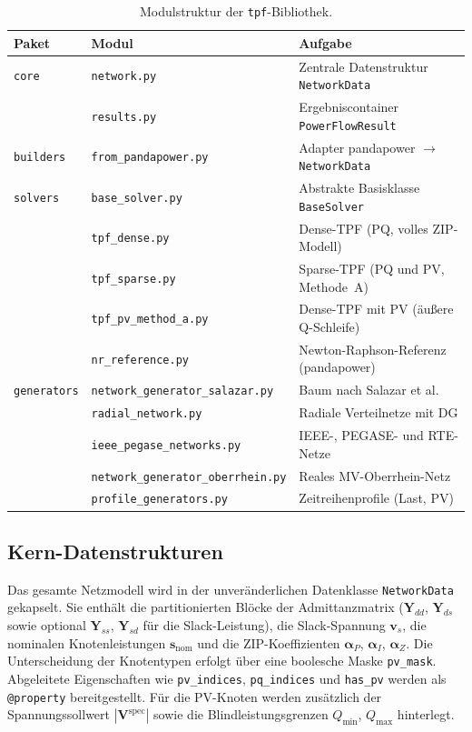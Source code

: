 \begin{table}[htbp]
	\centering
	\caption{Modulstruktur der \texttt{tpf}-Bibliothek.}
	\label{tab:module}
	\begin{tabular}{lll}
		\toprule
		\textbf{Paket} & \textbf{Modul} & \textbf{Aufgabe} \\
		\midrule
		\texttt{core}       & \texttt{network.py}    & Zentrale Datenstruktur \texttt{NetworkData} \\
		& \texttt{results.py}    & Ergebniscontainer \texttt{PowerFlowResult} \\
		\midrule
		\texttt{builders}   & \texttt{from\_pandapower.py} & Adapter pandapower $\rightarrow$ \texttt{NetworkData} \\
		\midrule
		\texttt{solvers}    & \texttt{base\_solver.py}     & Abstrakte Basisklasse \texttt{BaseSolver} \\
		& \texttt{tpf\_dense.py}       & Dense-TPF (PQ, volles ZIP-Modell) \\
		& \texttt{tpf\_sparse.py}      & Sparse-TPF (PQ und PV, Methode~A) \\
		& \texttt{tpf\_pv\_method\_a.py} & Dense-TPF mit PV (äußere Q-Schleife) \\
		& \texttt{nr\_reference.py}    & Newton-Raphson-Referenz (pandapower) \\
		\midrule
		\texttt{generators} & \texttt{network\_generator\_salazar.py} &  Baum nach Salazar et al. \\
		& \texttt{radial\_network.py}  & Radiale Verteilnetze mit DG \\
		& \texttt{ieee\_pegase\_networks.py} & IEEE-, PEGASE- und RTE-Netze \\
		& \texttt{network\_generator\_oberrhein.py} & Reales MV-Oberrhein-Netz \\
		& \texttt{profile\_generators.py} & Zeitreihenprofile (Last, PV) \\
		\bottomrule
	\end{tabular}
\end{table}

\subsection{Kern-Datenstrukturen}

Das gesamte Netzmodell wird in der unveränderlichen Datenklasse \texttt{NetworkData}
gekapselt. Sie enthält die partitionierten Blöcke der Admittanzmatrix
($\mathbf{Y}_{dd}$, $\mathbf{Y}_{ds}$ sowie optional $\mathbf{Y}_{ss}$,
$\mathbf{Y}_{sd}$ für die Slack-Leistung), die Slack-Spannung $\mathbf{v}_s$, die
nominalen Knotenleistungen $\mathbf{s}_{\mathrm{nom}}$ und die
ZIP-Koeffizienten $\boldsymbol{\alpha}_P$, $\boldsymbol{\alpha}_I$,
$\boldsymbol{\alpha}_Z$. Die Unterscheidung der Knotentypen erfolgt über eine boolesche
Maske \texttt{pv\_mask}. Abgeleitete Eigenschaften wie \texttt{pv\_indices},
\texttt{pq\_indices} und \texttt{has\_pv} werden als \texttt{@property} bereitgestellt.
Für die PV-Knoten werden zusätzlich der Spannungssollwert
$|\mathbf{V}^{\mathrm{spec}}|$ sowie die Blindleistungsgrenzen $Q_{\min}$, $Q_{\max}$
hinterlegt.

